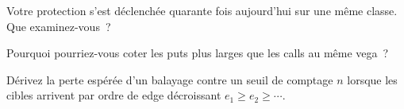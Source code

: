 \begin{interviewq}\label{iq:hf:automated-options-market-making:4}
Votre protection s'est déclenchée quarante fois aujourd'hui sur une même classe. Que examinez-vous~?
\end{interviewq}

\begin{interviewq}\label{iq:hf:automated-options-market-making:5}
Pourquoi pourriez-vous coter les puts plus larges que les calls au même vega~?
\end{interviewq}

\begin{interviewq}\label{iq:hf:automated-options-market-making:6}
Dérivez la perte espérée d'un balayage contre un seuil de comptage $n$ lorsque les cibles arrivent par ordre de edge décroissant $e_1\ge e_2\ge\cdots$.
\end{interviewq}
